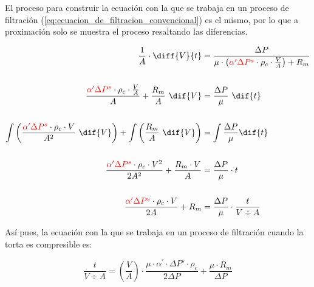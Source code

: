 El proceso para construir la ecuación con la que se trabaja en un proceso de filtración (\autoref{eq:ecuacion_de_filtracion_convencional}) es el mismo, por lo que a proximación solo se muestra el proceso resaltando las diferencias.

\begin{align*}
    \frac{1}{A} \cdot \diff{V}{t} &= \frac{\Delta P}{\mu \cdot \left(\textcolor{red}{\alpha^{\prime}\Delta P^{s}}\cdot\rho_{c}\cdot\frac{V}{A}\right) + R_{m}}
    \\\\
    \frac{\textcolor{red}{\alpha^{\prime}\Delta P^{s}}\cdot\rho_{c}\cdot\frac{V}{A}}{A} + \frac{R_{m}}{A} \ \dif{V} &= \frac{\Delta P}{\mu} \ \dif{t}
    \\\\
    \int\left(\frac{\textcolor{red}{\alpha^{\prime}\Delta P^{s}}\cdot\rho_{c}\cdot V}{A^{2}} \ \dif{V}\right) + \int\left(\frac{R_{m}}{A} \ \dif{V}\right) &= \int \frac{\Delta P}{\mu} \dif{t}
    \\\\
    \frac{\textcolor{red}{\alpha^{\prime}\Delta P^{s}}\cdot\rho_{c}\cdot V^{2}}{2A^{2}} + \frac{R_{m} \cdot V}{A} &= \frac{\Delta P}{\mu} \cdot t
    \\\\
    \frac{\textcolor{red}{\alpha^{\prime}\Delta P^{s}}\cdot\rho_{c}\cdot V}{2A} + R_{m} &= \frac{\Delta P}{\mu} \cdot \frac{t}{V \div A}
\end{align*}

Así pues, la ecuación con la que se trabaja en un proceso de filtración cuando la torta es compresible es:

\begin{equation}\label{eq:ecuacion_de_filtracion_convencional_para_tortas_compresibles}
    \frac{t}{V \div A}=\left(\frac{V}{A}\right)\cdot\frac{\mu\cdot\alpha^{\prime}\cdot\Delta P^{s}\cdot\rho_{c}}{2\Delta P} + \frac{\mu \cdot R_{m}}{\Delta P} 
\end{equation}



